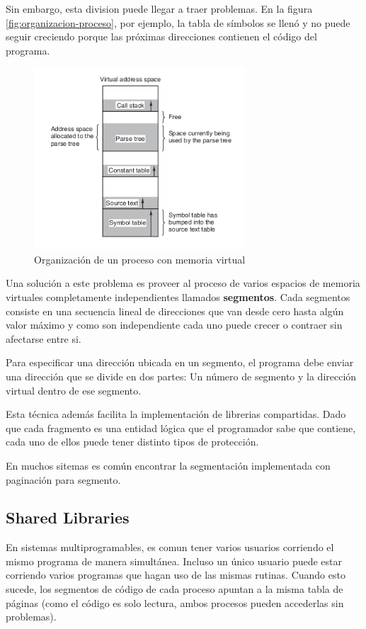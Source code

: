Sin embargo, esta division puede llegar a traer problemas. En la figura \ref{fig:organizacion-proceso}, por ejemplo,  la tabla de símbolos se llenó y no puede seguir creciendo porque las próximas direcciones contienen el código del programa.

\begin{figure}[h]
	\centering
	\includegraphics[width=0.7\textwidth]{imagenes/organizacion-proceso-virtual-unidimensional}
	\caption{Organización de un proceso con memoria virtual }
	\label{fig:organizacion-proceso-virtual-unidimensional}
\end{figure}

Una solución a este problema es proveer al proceso de varios espacios de memoria virtuales completamente independientes llamados \textbf{segmentos}. Cada segmentos consiste en una secuencia lineal de direcciones que van desde cero hasta algún valor máximo y como son independiente cada uno puede crecer o contraer sin afectarse entre si.

Para especificar una dirección ubicada en un segmento, el programa debe enviar una dirección que se divide en dos partes: Un número de segmento y la dirección virtual dentro de ese segmento.

Esta técnica además facilita la implementación de librerias compartidas. Dado que cada fragmento es una entidad lógica que el programador sabe que contiene, cada uno de ellos puede tener distinto tipos de protección.

En muchos sitemas es común encontrar la segmentación implementada con paginación para segmento.

\subsection{Shared Libraries}
En sistemas multiprogramables, es comun tener varios usuarios corriendo el mismo programa de manera simultánea. Incluso un único usuario puede estar corriendo varios programas que hagan uso de las mismas rutinas. Cuando esto sucede, los segmentos de código de cada proceso apuntan a la misma tabla de páginas (como el código es solo lectura, ambos procesos pueden accederlas sin problemas).

